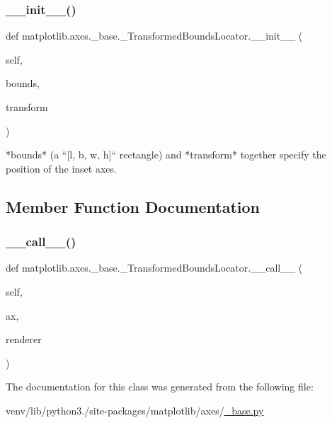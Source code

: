 \subsubsection{\texorpdfstring{\+\_\+\+\_\+init\+\_\+\+\_\+()}{\_\_init\_\_()}}
{\footnotesize\ttfamily def matplotlib.\+axes.\+\_\+base.\+\_\+\+Transformed\+Bounds\+Locator.\+\_\+\+\_\+init\+\_\+\+\_\+ (\begin{DoxyParamCaption}\item[{}]{self,  }\item[{}]{bounds,  }\item[{}]{transform }\end{DoxyParamCaption})}

\begin{DoxyVerb}*bounds* (a ``[l, b, w, h]`` rectangle) and *transform* together
specify the position of the inset axes.
\end{DoxyVerb}
 

\subsection{Member Function Documentation}
\mbox{\label{classmatplotlib_1_1axes_1_1__base_1_1__TransformedBoundsLocator_a6b56c02adb39fe18f5d69473e03efbf9}} 
\subsubsection{\texorpdfstring{\+\_\+\+\_\+call\+\_\+\+\_\+()}{\_\_call\_\_()}}
{\footnotesize\ttfamily def matplotlib.\+axes.\+\_\+base.\+\_\+\+Transformed\+Bounds\+Locator.\+\_\+\+\_\+call\+\_\+\+\_\+ (\begin{DoxyParamCaption}\item[{}]{self,  }\item[{}]{ax,  }\item[{}]{renderer }\end{DoxyParamCaption})}



The documentation for this class was generated from the following file\+:\begin{DoxyCompactItemize}
\item 
venv/lib/python3./site-\/packages/matplotlib/axes/\hyperlink{matplotlib_2axes_2__base_8py}{\+\_\+base.\+py}\end{DoxyCompactItemize}
